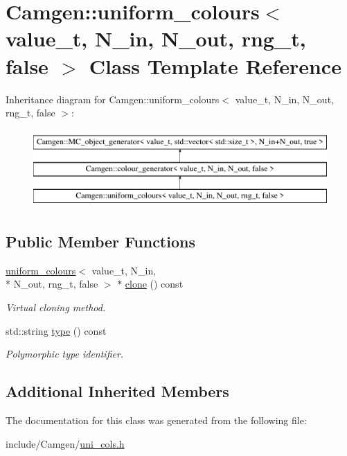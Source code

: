 \hypertarget{a00544}{\section{Camgen\-:\-:uniform\-\_\-colours$<$ value\-\_\-t, N\-\_\-in, N\-\_\-out, rng\-\_\-t, false $>$ Class Template Reference}
\label{a00544}
}
Inheritance diagram for Camgen\-:\-:uniform\-\_\-colours$<$ value\-\_\-t, N\-\_\-in, N\-\_\-out, rng\-\_\-t, false $>$\-:\begin{figure}[H]
\begin{center}
\leavevmode
\includegraphics[height=3.000000cm]{a00544}
\end{center}
\end{figure}
\subsection*{Public Member Functions}
\begin{DoxyCompactItemize}
\item 
\hypertarget{a00544_af8f2ccb01b566ea8474e50c3bb1eabc9}{\hyperlink{a00543}{uniform\-\_\-colours}$<$ value\-\_\-t, N\-\_\-in, \\*
N\-\_\-out, rng\-\_\-t, false $>$ $\ast$ \hyperlink{a00544_af8f2ccb01b566ea8474e50c3bb1eabc9}{clone} () const }\label{a00544_af8f2ccb01b566ea8474e50c3bb1eabc9}

\begin{DoxyCompactList}\small\item\em Virtual cloning method. \end{DoxyCompactList}\item 
\hypertarget{a00544_a659e024a65116badf2b1744d10c1f1d2}{std\-::string \hyperlink{a00544_a659e024a65116badf2b1744d10c1f1d2}{type} () const }\label{a00544_a659e024a65116badf2b1744d10c1f1d2}

\begin{DoxyCompactList}\small\item\em Polymorphic type identifier. \end{DoxyCompactList}\end{DoxyCompactItemize}
\subsection*{Additional Inherited Members}


The documentation for this class was generated from the following file\-:\begin{DoxyCompactItemize}
\item 
include/\-Camgen/\hyperlink{a00794}{uni\-\_\-cols.\-h}\end{DoxyCompactItemize}
